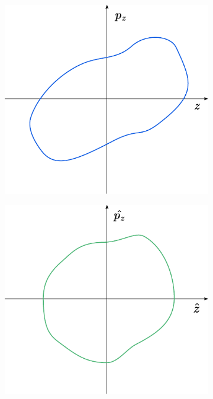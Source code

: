 \begin{figure}[H]
    \centering
    \begin{subfigure}[b]{0.292\textwidth}
        \includegraphics[width=\linewidth]{images/phase_space_regular_coordinates_wonky.pdf}
    \end{subfigure}
    \begin{subfigure}[b]{0.292\textwidth}
        \includegraphics[width=\linewidth]{images/phase_space_normalized_coordinates_wonky.pdf}

\end{subfigure}
\end{figure}
